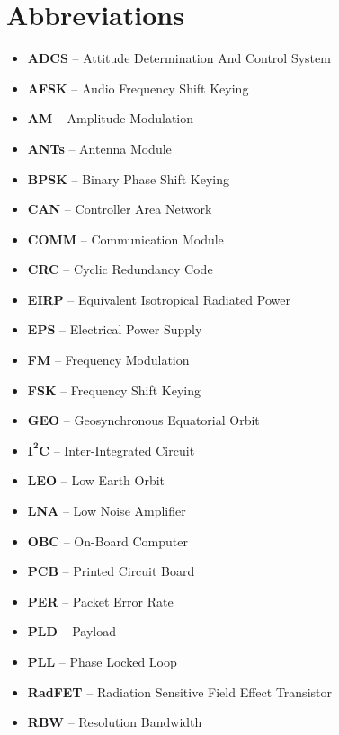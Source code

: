 \chapter{Abbreviations}
\vspace{-1cm}
\begin{itemize}
    \setlength\itemsep{-0.5em}
    \item    \textbf{ADCS}      --    Attitude Determination And Control System
    \item    \textbf{AFSK}      --    Audio Frequency Shift Keying
    \item    \textbf{AM}      --    Amplitude Modulation
    \item    \textbf{ANTs}      --    Antenna Module
    \item    \textbf{BPSK}      --    Binary Phase Shift Keying
    \item    \textbf{CAN}      --    Controller Area Network
    \item    \textbf{COMM}      --    Communication Module
    \item    \textbf{CRC}      --    Cyclic Redundancy Code
    \item    \textbf{EIRP}      --    Equivalent Isotropical Radiated Power
    \item    \textbf{EPS}      --    Electrical Power Supply
    \item    \textbf{FM}      --    Frequency Modulation
    \item    \textbf{FSK}      --    Frequency Shift Keying
    \item    \textbf{GEO}      --    Geosynchronous Equatorial Orbit
    \item    \textbf{$\mathbf{I^2C}$}   --    Inter-Integrated Circuit
    \item    \textbf{LEO}      --    Low Earth Orbit
    \item    \textbf{LNA}      --    Low Noise Amplifier
    \item    \textbf{OBC}      --    On-Board Computer
    \item    \textbf{PCB}      --    Printed Circuit Board
    \item    \textbf{PER}      --    Packet Error Rate
    \item    \textbf{PLD}      --    Payload
    \item    \textbf{PLL}      --    Phase Locked Loop
    \item    \textbf{RadFET}   --    Radiation Sensitive Field Effect Transistor
    \item    \textbf{RBW}      --    Resolution Bandwidth

\end{itemize}
